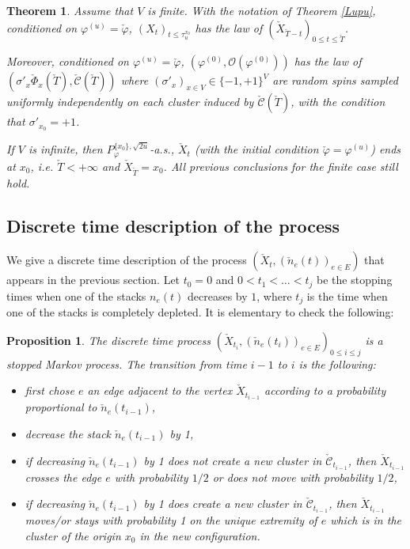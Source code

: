 \documentclass[11pt,a4paper]{amsart}
\numberwithin{equation}{section}
\newtheorem{theorem}{Theorem}
\newtheorem{proposition}{Proposition}[section]
\def\ccc{{\mathcal C}}
\begin{document}
\begin{theorem}
\label{thm-Poisson}
Assume that $V$ is finite.
With the notation of Theorem \ref{Lupu}, conditioned on $\varphi^{(u)}=\check\varphi$, $(X_{t})_{t\le \tau_{u}^{x_{0}}}$ has the law
of $(\check X_{\check T-t})_{0\le t\le \check T}$.

Moreover, conditioned on  $\varphi^{(u)}=\check\varphi$, $(\varphi^{(0)},\mathcal{O}(\varphi^{(0)}))$ has the law of
$(\sigma'_x\check\Phi_x(\check T), \check\ccc(\check T))$ where $(\sigma'_x)_{x\in V}\in \lbrace -1,+1\rbrace^{V}$ are random spins sampled uniformly independently on 
each cluster induced by $\check\ccc(\check T)$,
with the condition that $\sigma'_{x_0}=+1$.

If $V$ is infinite, then $P_{\varphi}^{\lbrace x_{0}\rbrace, \sqrt{2u}}$-a.s.,
$\check X_t$ (with the initial condition $\check\varphi=\varphi^{(u)}$)
ends at $x_0$, i.e. $\check T<+\infty$ and $\check X_{\check T}=x_0$. 
All previous conclusions for the finite case still hold.
\end{theorem}

\subsection{Discrete time description of the process}
\label{sec_dicr_time}

We give a discrete time description of the process
$(\check X_t, (\check n_e(t))_{e\in E})$
that appears in the previous section.
Let $t_{0}=0$ and $0<t_{1}<\dots<t_{j}$ be the stopping times when one of the
stacks $n_e(t)$ decreases by $1$, where $t_{j}$ is the time when one of the stacks is completely depleted. It is elementary to check the following:

\begin{proposition}
\label{PropDiscrTime}
The discrete time process
$(\check X_{t_{i}}, (\check n_e(t_{i}))_{e\in E})_{0\leq i\leq j}$ is a stopped Markov process. The transition from time $i-1$ to $i$ is the following:
\begin{itemize}
\item first chose $e$ an edge adjacent to the vertex $\check X_{t_{i-1}}$
according to a probability proportional to $\check n_e(t_{i-1})$,
\item decrease the stack $\check n_e(t_{i-1})$ by 1,
\item
if decreasing $\check n_e(t_{i-1})$ by 1 does not create a new cluster in 
$\check \ccc_{t_{i-1}}$, then $\check X_{t_{i-1}}$ crosses the edge
$e$ with probability ${1/2}$ or does not move with probability ${1/2}$,
\item
if decreasing $\check n_e(t_{i-1})$ by 1 does create a new cluster in 
$\check \ccc_{t_{i-1}}$,
 then $\check X_{t_{i-1}}$ moves/or stays with probability 1 on the unique extremity of $e$ which is in the cluster of the origin $x_0$ in the new configuration.
\end{itemize}
\end{proposition}
\end{document}
